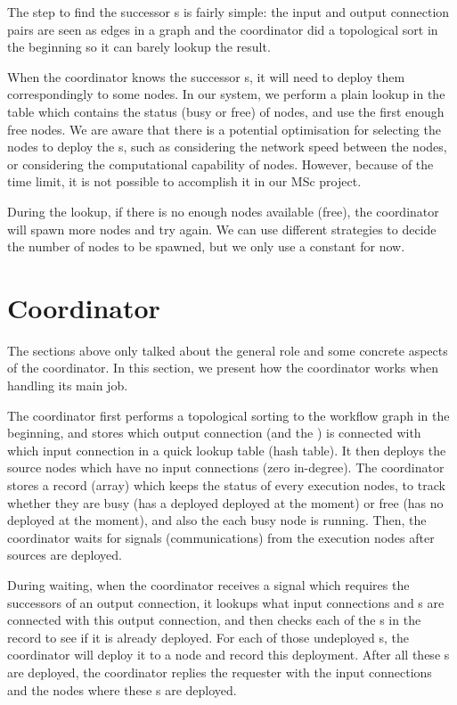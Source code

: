 The step to find the successor \tPEInst{}s is fairly simple: the input and output connection pairs are seen as edges in a graph and the coordinator did a topological sort in the beginning so it can barely lookup the result.

When the coordinator knows the successor \tPEInst{}s, it will need to deploy them correspondingly to some nodes. In our system, we perform a plain lookup in the table which contains the status (busy or free) of nodes, and use the first enough free nodes. We are aware that there is a potential optimisation for selecting the nodes to deploy the \tPEInst{}s, such as considering the network speed between the nodes, or considering the computational capability of nodes. However, because of the time limit, it is not possible to accomplish it in our MSc project.

During the lookup, if there is no enough nodes available (free), the coordinator will spawn more nodes and try again. We can use different strategies to decide the number of nodes to be spawned, but we only use a constant for now.

\section{Coordinator}
The sections above only talked about the general role and some concrete aspects of the coordinator. In this section, we present how the coordinator works when handling its main job.

The coordinator first performs a topological sorting to the workflow graph in the beginning, and stores which output connection (and the \tPEInst) is connected with which input connection in a quick lookup table (hash table). It then deploys the source nodes which have no input connections (\ie zero in-degree). The coordinator stores a record (array) which keeps the status of every execution nodes, to track whether they are busy (has a \tPEInst deployed deployed at the moment) or free (has no \tPEInst deployed at the moment), and also the \tPEInst each busy node is running.
Then, the coordinator waits for signals (\ie communications) from the execution nodes after sources are deployed.

During waiting, when the coordinator receives a signal which requires the successors of an output connection, it lookups what input connections and \tPEInst{}s are connected with this output connection, and then checks each of the \tPEInst{}s in the record to see if it is already deployed. For each of those undeployed \tPEInst{}s, the coordinator will deploy it to a node and record this deployment. After all these \tPEInst{}s are deployed, the coordinator replies the requester with the input connections and the nodes where these \tPEInst{}s are deployed.

